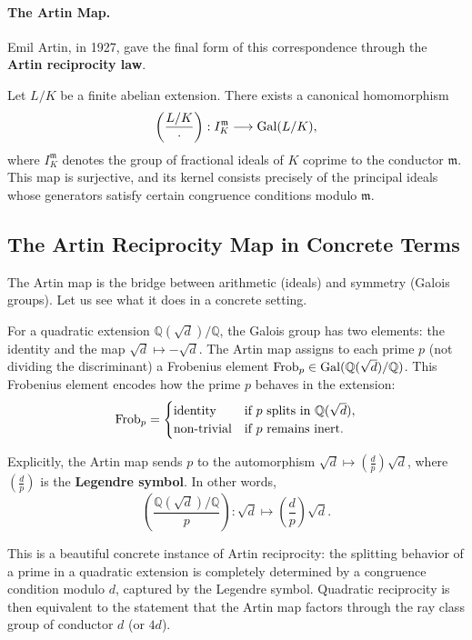 \paragraph{The Artin Map.} Emil Artin, in 1927, gave the final form of this correspondence through the \textbf{Artin reciprocity law}.

\begin{theorem}\label{thm:artin-reciprocity-cft}
Let $L/K$ be a finite abelian extension. There exists a canonical homomorphism
\[
\left(\frac{L/K}{\cdot}\right) : I_K^{\mathfrak{m}} \longrightarrow \operatorname{Gal}(L/K),
\]
where $I_K^{\mathfrak{m}}$ denotes the group of fractional ideals of $K$ coprime to the conductor $\mathfrak{m}$. This map is surjective, and its kernel consists precisely of the principal ideals whose generators satisfy certain congruence conditions modulo $\mathfrak{m}$.
\end{theorem}

\subsection{The Artin Reciprocity Map in Concrete Terms}

The Artin map is the bridge between arithmetic (ideals) and symmetry (Galois groups). Let us see what it does in a concrete setting.

For a quadratic extension $\mathbb{Q}(\sqrt{d})/\mathbb{Q}$, the Galois group has two elements: the identity and the map $\sqrt{d} \mapsto -\sqrt{d}$. The Artin map assigns to each prime $p$ (not dividing the discriminant) a Frobenius element $\operatorname{Frob}_p \in \operatorname{Gal}(\mathbb{Q}(\sqrt{d})/\mathbb{Q})$. This Frobenius element encodes how the prime $p$ behaves in the extension:
\[
\operatorname{Frob}_p = \begin{cases}
\text{identity} & \text{if $p$ splits in $\mathbb{Q}(\sqrt{d})$},\\
\text{non-trivial} & \text{if $p$ remains inert}.
\end{cases}
\]

Explicitly, the Artin map sends $p$ to the automorphism $\sqrt{d} \mapsto \left(\frac{d}{p}\right)\sqrt{d}$, where $\left(\frac{d}{p}\right)$ is the \textbf{Legendre symbol}. In other words,
\[
\left(\frac{\mathbb{Q}(\sqrt{d})/\mathbb{Q}}{p}\right) : \sqrt{d} \longmapsto \left(\frac{d}{p}\right)\sqrt{d}.
\]

This is a beautiful concrete instance of Artin reciprocity: the splitting behavior of a prime in a quadratic extension is completely determined by a congruence condition modulo $d$, captured by the Legendre symbol. Quadratic reciprocity is then equivalent to the statement that the Artin map factors through the ray class group of conductor $d$ (or $4d$).

